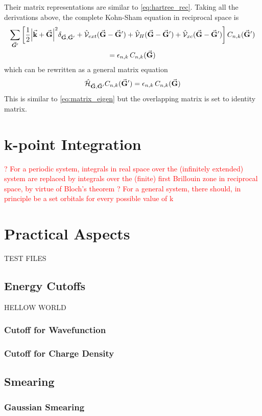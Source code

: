 Their matrix representations are similar to \eqref{eq:hartree_rec}. Taking all the derivations above, the complete Kohn-Sham equation in reciprocal space  is 
\begin{multline}
    \sum_{\va*{G}'} \left[ \frac{1}{2} \abs{\va{k} + \va{G}}^2 \delta_{\va{G},\va{G}'} + \hat{\mathcal{V}}_{ext}(\va{G} - \va{G}') + \hat{\mathcal{V}}_H(\va{G} - \va{G}') + \hat{\mathcal{V}}_{xc}(\va{G} - \va{G}') \right] C_{n,k}(\va{G}') \\
    = \epsilon_{n,k}\, C_{n,k}(\va{G})
\end{multline}
which can be rewritten as a general matrix equation 
\begin{equation}
    \hat{\mathcal{H}}_{\va{G},\va{G}'} C_{n,k}(\va{G}') =  \epsilon_{n,k}\, C_{n,k}(\va{G})
\end{equation}
This is similar to \eqref{eq:matrix_eigen} but the overlapping matrix is set to identity matrix.

\section{k-point Integration}

\textcolor{red}{? For a periodic system, integrals in real space over the (infinitely extended) system are replaced by integrals over the (finite) first Brillouin zone in reciprocal space, by virtue of Bloch's theorem ?
For a  general system, there should, in principle be a  set orbitals for every possible value of k}


\section{Practical Aspects}
    TEST FILES
    \subsection{Energy Cutoffs}
    HELLOW WORLD
        \subsubsection{Cutoff for Wavefunction}
        \subsubsection{Cutoff for Charge Density}
    \subsection{Smearing}
        \subsubsection{Gaussian Smearing}

